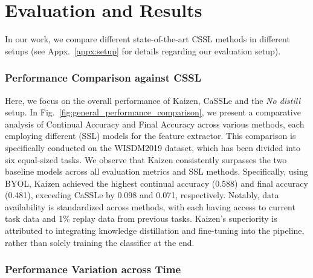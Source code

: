 \section{Evaluation and Results}
In our work, we compare different state-of-the-art CSSL methods in different setups (see Appx.~\ref{appx:setup} for details regarding our evaluation setup).

\subsubsection{Performance Comparison against CSSL}

Here, we focus on the overall performance of Kaizen, CaSSLe and the \emph{No distill} setup. In Fig.~\ref{fig:general_performance_comparison}, we present a comparative analysis of Continual Accuracy and Final Accuracy across various methods, each employing different (SSL) models for the feature extractor. This comparison is specifically conducted on the WISDM2019 dataset, which has been divided into six equal-sized tasks. We observe that Kaizen consistently surpasses the two baseline models across all evaluation metrics and SSL methods. Specifically, using BYOL, Kaizen achieved the highest continual accuracy (0.588) and final accuracy (0.481), exceeding CaSSLe by 0.098 and 0.071, respectively. Notably, data availability is standardized across methods, with each having access to current task data and 1\% replay data from previous tasks. Kaizen's superiority is attributed to integrating knowledge distillation and fine-tuning into the pipeline, rather than solely training the classifier at the end.

\subsubsection{Performance Variation across Time}

